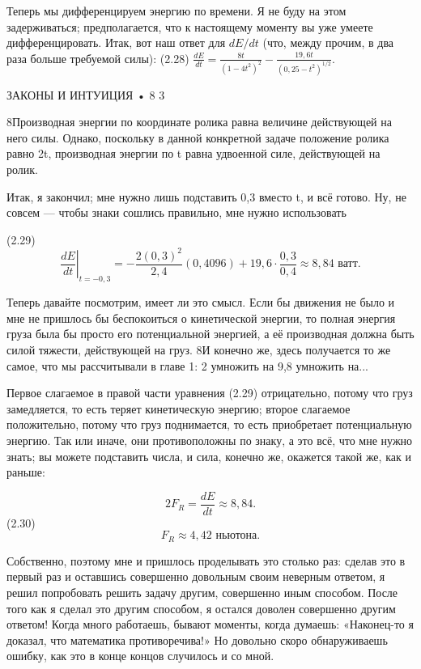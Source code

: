 \documentclass[10pt,oneside]{article}
\begin{document}
Теперь мы дифференцируем энергию по времени. Я не буду на этом задерживаться; предполагается, что к настоящему моменту вы уже умеете дифференцировать. Итак, вот наш ответ для \(dE/dt\) (что, между прочим, в два раза больше требуемой силы): (2.28) \(\frac{dE}{dt} = \frac{8t}{(1 - 4t^2)^2} - \frac{19,6t}{(0,25 - t^2)^{1/2}}\).\par

ЗАКОНЫ И ИНТУИЦИЯ • 8 3\par

8Производная энергии по координате ролика равна величине действующей на него силы. Однако, поскольку в данной конкретной задаче положение ролика равно 2t, производная энергии по t равна удвоенной силе, действующей на ролик.\par

Итак, я закончил; мне нужно лишь подставить 0,3 вместо t, и всё готово. Ну, не совсем --- чтобы знаки сошлись правильно, мне нужно использовать\par

(2.29) \[\left. \frac{dE}{dt} \right|_{t = -0,3} = -\frac{2(0,3)^2}{2,4}(0,4096) + 19,6 \cdot \frac{0,3}{0,4} \approx 8,84\text{ ватт}.\]\par

Теперь давайте посмотрим, имеет ли это смысл. Если бы движения не было и мне не пришлось бы беспокоиться о кинетической энергии, то полная энергия груза была бы просто его потенциальной энергией, а её производная должна быть силой тяжести, действующей на груз. 8И конечно же, здесь получается то же самое, что мы рассчитывали в главе 1: 2 умножить на 9,8 умножить на...\par

Первое слагаемое в правой части уравнения (2.29) отрицательно, потому что груз замедляется, то есть теряет кинетическую энергию; второе слагаемое положительно, потому что груз поднимается, то есть приобретает потенциальную энергию. Так или иначе, они противоположны по знаку, а это всё, что мне нужно знать; вы можете подставить числа, и сила, конечно же, окажется такой же, как и раньше:\par

\[2F_R = \frac{dE}{dt} \approx 8,84.\] (2.30) \[F_R \approx 4,42\text{ ньютона}.\]\par

Собственно, поэтому мне и пришлось проделывать это столько раз: сделав это в первый раз и оставшись совершенно довольным своим неверным ответом, я решил попробовать решить задачу другим, совершенно иным способом. После того как я сделал это другим способом, я остался доволен совершенно другим ответом! Когда много работаешь, бывают моменты, когда думаешь: «Наконец-то я доказал, что математика противоречива!» Но довольно скоро обнаруживаешь ошибку, как это в конце концов случилось и со мной.\par
\end{document}
